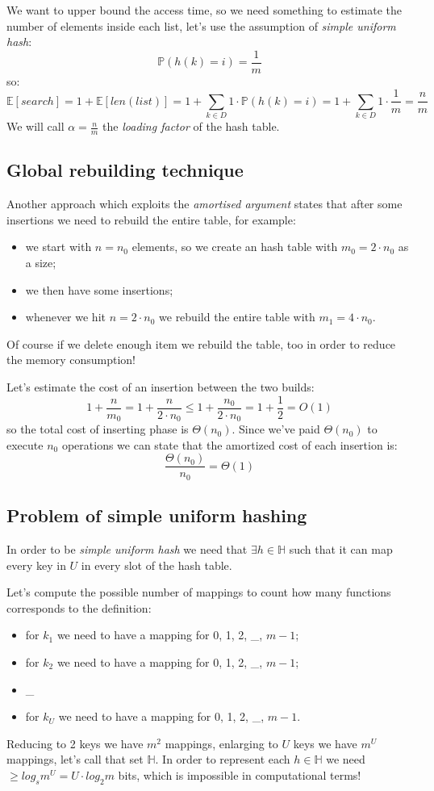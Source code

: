 We want to upper bound the access time, so we need something to estimate the number of elements inside each list, let's use the assumption of \emph{simple uniform hash}:
$$
    \mathbb{P}(h(k) = i) = \frac{1}{m}
$$
so:
$$
    \mathbb{E}[search] = 1 + \mathbb{E}[len(list)] = 1 + \sum_{k \in D} 1 \cdot \mathbb{P}(h(k) = i) = 1 + \sum_{k \in D} 1 \cdot \frac{1}{m} = \frac{n}{m}
$$
We will call $\alpha = \frac{n}{m}$ the \emph{loading factor} of the hash table.

\subsection{Global rebuilding technique}
Another approach which exploits the \emph{amortised argument} states that after some insertions we need to rebuild the entire table, for example:
\begin{itemize}
    \item we start with $n = n_0$ elements, so we create an hash table with $m_0 = 2 \cdot n_0$ as a size;
    \item we then have some insertions;
    \item whenever we hit $n = 2 \cdot n_0$ we rebuild the entire table with $m_1 = 4 \cdot n_0$.
\end{itemize}
Of course if we delete enough item we rebuild the table, too in order to reduce the memory consumption!

Let's estimate the cost of an insertion between the two builds:
$$
    1 + \frac{n}{m_0} = 1 + \frac{n}{2 \cdot n_0} \leq 1 + \frac{n_0}{2 \cdot n_0} = 1 + \frac{1}{2} = O(1)
$$
so the total cost of inserting phase is $\Theta(n_0)$.
Since we've paid $\Theta(n_0)$ to execute $n_0$ operations we can state that the amortized cost of each insertion is:
$$
    \frac{\Theta(n_0)}{n_0} = \Theta(1)
$$

\subsection{Problem of simple uniform hashing}
In order to be \emph{simple uniform hash} we need that $ \exists h \in \mathbb{H}$ such that it can map every key in $U$ in every slot of the hash table.

Let's compute the possible number of mappings to count how many functions corresponds to the definition:
\begin{itemize}
    \item for $k_1$ we need to have a mapping for 0, 1, 2, \_, $m-1$;
    \item for $k_2$ we need to have a mapping for 0, 1, 2, \_, $m-1$;
    \item \_
    \item for $k_U$ we need to have a mapping for 0, 1, 2, \_, $m-1$.
\end{itemize}
Reducing to 2 keys we have $m^2$ mappings, enlarging to $U$ keys we have $m^U$ mappings, let's call that set $\mathbb{H}$.
In order to represent each $h \in \mathbb{H}$ we need $\geq log_s m^U = U \cdot log_2 m$ bits, which is impossible in computational terms!

